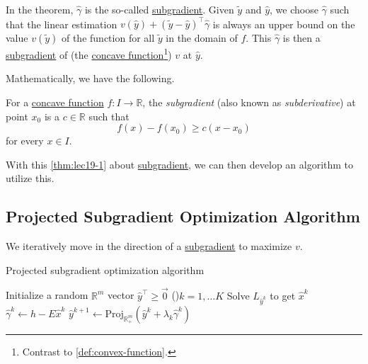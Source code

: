 In the theorem, \(\hat{\gamma}\) is the so-called \hyperref[def:subgradient]{subgradient}. Given \(\widetilde{y}\) and \(\hat{y}\), we choose \(\hat{\gamma}\) such that the linear estimation \(v(\hat{y})+(\widetilde{y} - \hat{y})^{\top}\hat{\gamma}\) is always an upper bound on the value \(v(\widetilde{y})\) of the function for all \(\widetilde{y}\) in the domain of \(f\). This \(\hat{\gamma}\) is then a \hyperref[def:subgradient]{subgradient} of (the \hyperref[def:convex-function]{concave function}\footnote{Contrast to \autoref{def:convex-function}.}) \(v\) at \(\hat{y}\).

Mathematically, we have the following.

\begin{definition}[Subgradient]\label{def:subgradient}
	For a \hyperref[def:convex-function]{concave function} \(f\colon I\to \mathbb{R}\), the \emph{subgradient} (also known as \emph{subderivative}) at point \(x_0\) is a \(c\in \mathbb{R}\) such that
	\[
		f(x) - f(x_{0})\geq c(x - x_0)
	\]
	for every \(x\in I\).
\end{definition}

With this \autoref{thm:lec19-1} about \hyperref[def:subgradient]{subgradient}, we can then develop an algorithm to utilize this.

\subsection{Projected Subgradient Optimization Algorithm}
\begin{intuition}
	We iteratively move in the direction of a \hyperref[def:subgradient]{subgradient} to maximize \(v\).
\end{intuition}

\begin{algorithm}[H]\label{algo:projected-subgradient-optimization-algorithm}
	\DontPrintSemicolon
	\caption{Projected subgradient optimization algorithm}
	\BlankLine

	Initialize a random \(\mathbb{R} ^m\) vector \(\hat{y}^{\top}\geq \vec{0}\)\;
	\For(){\(k = 1, \ldots K\)}{
	Solve \(L_{\hat{y}^k}\) to get \(\hat{x}^k\)\;
	\(\hat{\gamma}^k \gets h - E \hat{x}^k\)\;
	\(\hat{y}^{k+1} \gets \mathrm{Proj}_{\mathbb{R}^m_+}(\hat{y}^k + \lambda_{k}\hat{\gamma}^k) \)\;\label{algo:projected-subgradient-optimization-algorithm:line5}
	}
	\;
\end{algorithm}

